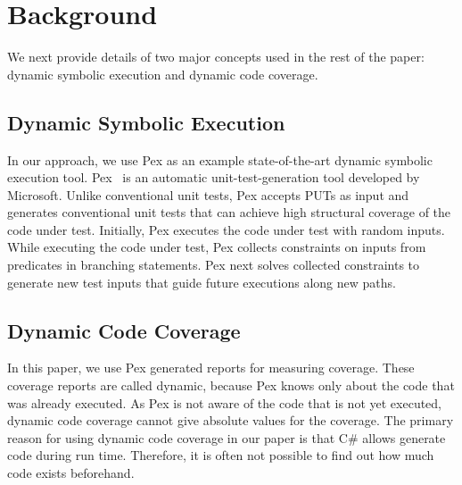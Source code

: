 \section{Background}
\label{sec:background}

We next provide details of two major concepts used in the rest of
the paper: dynamic symbolic execution and dynamic code coverage.

\subsection{Dynamic Symbolic Execution}

In our approach, we use Pex as an example state-of-the-art dynamic symbolic 
execution tool. Pex~\cite{tillman:pexwhite} is an automatic unit-test-generation 
tool developed by Microsoft. Unlike conventional unit tests, Pex accepts
PUTs as input and generates conventional unit tests that can achieve high 
structural coverage of the code under test. Initially, Pex
executes the code under test with random inputs. While executing
the code under test, Pex collects constraints on inputs from predicates
in branching statements. Pex next solves collected constraints
to generate new test inputs that guide future executions along
new paths. 

\subsection{Dynamic Code Coverage}

In this paper, we use Pex generated reports for measuring coverage. These coverage
reports are called dynamic, because Pex knows only about the code that was already executed.
As Pex is not aware of the code that is not yet executed, dynamic code coverage
cannot give absolute values for the coverage. The primary reason for using
dynamic code coverage in our paper is that C\# allows generate code during run time.
Therefore, it is often not possible to find out how much code exists beforehand.